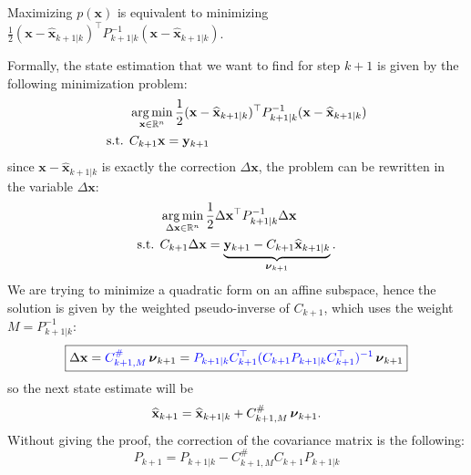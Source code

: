 \documentclass[10pt, a4paper]{report}
\begin{document}
\begin{boxobservation}{}{}
    Maximizing $p(\mathbf x)$ is equivalent to minimizing $\frac{1}{2}(\mathbf x-\widehat{\mathbf x}_{k+1|k})^\top 
        P_{k+1|k}^{-1}
       (\mathbf x-\widehat{\mathbf x}_{k+1|k})$.
\end{boxobservation}
Formally, the state estimation that we want to find for step $k+1$ is given by the following minimization problem:\begin{align}
    &\operatorname*{arg\,min}_{\mathbf x\in {\mathbb R}^n}\frac{1}{2}(\mathbf x-\widehat{\mathbf x}_{k+1|k})^\top 
        P_{k+1|k}^{-1}
       (\mathbf x-\widehat{\mathbf x}_{k+1|k})\\
       \text{s.t. }&C_{k+1}\mathbf x = \mathbf y_{k+1}
\end{align}
since $\mathbf x-\widehat{\mathbf x}_{k+1|k}$ is exactly the correction $\Delta \mathbf x$, the problem can be rewritten in the variable $\Delta\mathbf x$:
\begin{align}
    &\operatorname*{arg\,min}_{\Delta\mathbf x\in {\mathbb R}^n}\frac{1}{2}\Delta\mathbf x^\top 
        P_{k+1|k}^{-1}
       \Delta\mathbf x\\
       \text{s.t. }&C_{k+1}\Delta \mathbf x =\underbrace{ \mathbf y_{k+1}-C_{k+1}\widehat{\mathbf x}_{k+1|k}}_{{\boldsymbol{\nu}}_{k+1}}.
\end{align}
We are trying to minimize a quadratic form on an affine subspace, hence the solution is given by the weighted pseudo-inverse of $C_{k+1}$, which uses the weight $M=P_{k+1|k}^{-1}$:\begin{equation}
    \boxed{
      \Delta\mathbf x = \color{blue}C^\#_{k+1,M}\color{black}\, {\boldsymbol{\nu}}_{k+1}=\color{blue}P_{k+1|k}C_{k+1}^\top (C_{k+1}P_{k+1|k}C_{k+1}^\top)^{-1}\color{black}\, {\boldsymbol{\nu}}_{k+1}
    }
\end{equation}
so the next state estimate will be\begin{equation}
    \widehat{\mathbf x}_{k+1}=
     \widehat{\mathbf x}_{k+1|k}+C^\#_{k+1,M}\, {\boldsymbol{\nu}}_{k+1}.
\end{equation}
Without giving the proof, the correction of the covariance matrix is the following:\begin{equation}
    P_{k+1}=P_{k+1|k}-C_{k+1,M}^\#C_{k+1}P_{k+1|k}
\end{equation}
\end{document}

